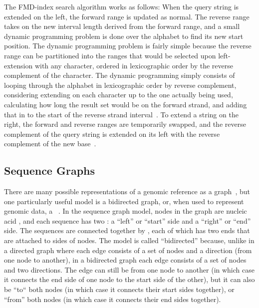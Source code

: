 The FMD-index search algorithm works as follows: When the query string is extended on the left, the forward range is updated as normal. The reverse range takes on the new interval length derived from the forward range, and a small dynamic programming problem is done over the alphabet to find its new start position. The dynamic programming problem is fairly simple because the reverse range can be partitioned into the ranges that would be selected upon left-extension with any character, ordered in lexicographic order by the reverse complement of the character. The dynamic programming simply consists of looping through the alphabet in lexicographic order by reverse complement, considering extending on each character up to the one actually being used, calculating how long the result set would be on the forward strand, and adding that in to the start of the reverse strand interval~\cite{li2012exploring}. To extend a string on the right, the forward and reverse ranges are temporarily swapped, and the reverse complement of the query string is extended on its left with the reverse complement of the new base~\cite{li2012exploring}.


\subsection{Sequence Graphs}

There are many possible representations of a genomic reference as a graph~\cite{computational2016computational}, but one particularly useful model is a bidirected graph, or, when used to represent genomic data, a ~\cite{paten2017genome}. In the sequence graph model, nodes in the graph are nucleic acid , and each sequence has two : a ``left'' or ``start'' side and a ``right'' or ``end'' side. The sequences are connected together by , each of which has two ends that are attached to sides of nodes. The model is called ``bidirected'' because, unlike in a directed graph where each edge consists of a set of nodes and a direction (from one node to another), in a bidirected graph each edge consists of a set of nodes and two directions. The edge can still be from one node to another (in which case it connects the end side of one node to the start side of the other), but it can also be ``to`` both nodes (in which case it connects their start sides together), or ``from'' both nodes (in which case it connects their end sides together).


